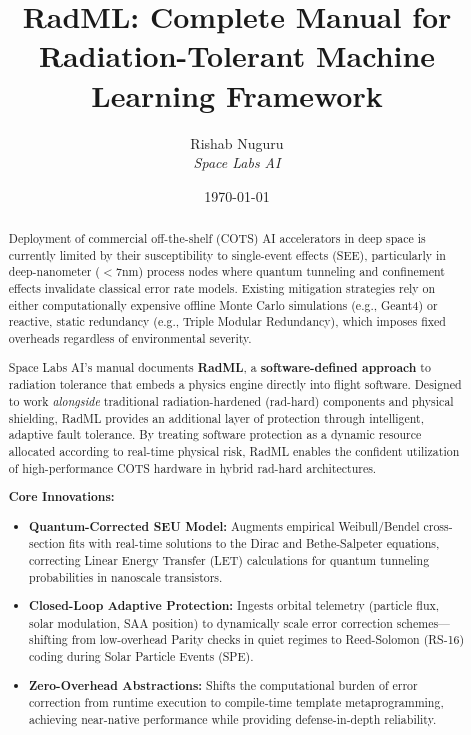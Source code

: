 \documentclass[11pt,a4paper]{article}
\title{\textbf{RadML: Complete Manual for } \\
Radiation-Tolerant Machine Learning Framework}
\author{Rishab Nuguru \\ \textit{Space Labs AI}}
\date{\today}
\begin{document}
\maketitle

\vspace{1em}
\begin{center}
\end{center}
\vspace{1em}

\begin{abstract}
\noindent
Deployment of commercial off-the-shelf (COTS) AI accelerators in deep space is currently limited by their susceptibility to single-event effects (SEE), particularly in deep-nanometer ($<7\text{nm}$) process nodes where quantum tunneling and confinement effects invalidate classical error rate models. Existing mitigation strategies rely on either computationally expensive offline Monte Carlo simulations (e.g., Geant4) or reactive, static redundancy (e.g., Triple Modular Redundancy), which imposes fixed overheads regardless of environmental severity.

Space Labs AI's manual documents \textbf{RadML}, a \textbf{software-defined approach} to radiation tolerance that embeds a physics engine directly into flight software. Designed to work \textit{alongside} traditional radiation-hardened (rad-hard) components and physical shielding, RadML provides an additional layer of protection through intelligent, adaptive fault tolerance. By treating software protection as a dynamic resource allocated according to real-time physical risk, RadML enables the confident utilization of high-performance COTS hardware in hybrid rad-hard architectures.

\vspace{0.5em}
\noindent\textbf{Core Innovations:}
\begin{itemize}
    \item \textbf{Quantum-Corrected SEU Model:} Augments empirical Weibull/Bendel cross-section fits with real-time solutions to the Dirac and Bethe-Salpeter equations, correcting Linear Energy Transfer (LET) calculations for quantum tunneling probabilities in nanoscale transistors.
    \item \textbf{Closed-Loop Adaptive Protection:} Ingests orbital telemetry (particle flux, solar modulation, SAA position) to dynamically scale error correction schemes---shifting from low-overhead Parity checks in quiet regimes to Reed-Solomon (RS-16) coding during Solar Particle Events (SPE).
    \item \textbf{Zero-Overhead Abstractions:} Shifts the computational burden of error correction from runtime execution to compile-time template metaprogramming, achieving near-native performance while providing defense-in-depth reliability.
\end{itemize}


\end{abstract}
\end{document}
